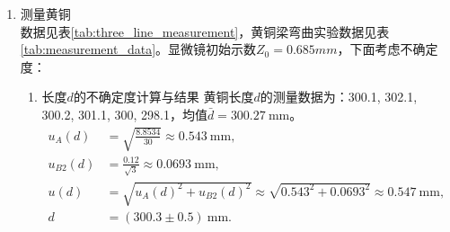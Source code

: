 \documentclass[11pt]{article}
\begin{document}
\begin{enumerate}
    \noindent（2）相对不确定度：  
    \begin{align*}
    u_r(Y) &= \sqrt{\left(3 \cdot \frac{u(d)}{d}\right)^2 + \left(3 \cdot \frac{u(a)}{a}\right)^2 + \left(\frac{u(b)}{b}\right)^2 + \left(\frac{u(\Delta M)}{\Delta M}\right)^2 + \left(\frac{u(\Delta Z)}{\Delta Z}\right)^2} \\
    &= \sqrt{\left(3 \cdot \frac{0.3}{229.9}\right)^2 + \left(3 \cdot \frac{0.004}{0.964}\right)^2 + \left(\frac{0.06}{23.09}\right)^2 + \left(\frac{0.1}{80.0}\right)^2 + \left(\frac{0.03}{0.56}\right)^2} \\
    &\approx \sqrt{0.0000154 + 0.000155 + 0.00000675 + 0.00000156 + 0.002869} \\
    &\approx \sqrt{0.003092} \approx 0.0556
    \end{align*}
    
    \noindent（3）绝对不确定度与最终结果：  
    \begin{align*}
    u(Y) &= \bar{Y} \cdot u_r(Y) \approx 2.10 \times 10^{11} \times 0.0556 \approx 1.2 \times 10^{10} \, \text{Pa} \\
    \bar{Y} &= (2.1 \pm 0.1) \times 10^{11} \, \text{Pa}
    \end{align*}
    
    \noindent 计算相对误差\(\eta\)：  
    
    \noindent 相对误差公式为\(\eta = \left| \frac{Y - Y_0}{Y_0} \right| \times 100\%\)，其中：  
    
    \noindent 实验值\(Y = 2.1 \times 10^{11} \, \text{Pa}\)，标准值\(Y_0 = 18.15 \times 10^{10} \, \text{Pa} = 1.815 \times 10^{11} \, \text{Pa}\)。  
    
    \noindent 代入公式计算：  
    \begin{align*}
    \eta &= \left| \frac{2.1 \times 10^{11} - 1.815 \times 10^{11}}{1.815 \times 10^{11}} \right| \times 100\% \\
    &= \left| \frac{0.285 \times 10^{11}}{1.815 \times 10^{11}} \right| \times 100\% \\
    &\approx 0.157 \times 100\% \\
    &\approx 15.7\%
    \end{align*}

    \item 测量黄铜\\
    数据见表\ref{tab:three_line_measurement}，黄铜梁弯曲实验数据见表\ref{tab:measurement_data}。显微镜初始示数$Z_0 = 0.685mm$，下面考虑不确定度：
\begin{enumerate}
  \item 长度\( d \)的不确定度计算与结果
  黄铜长度\( d \)的测量数据为：300.1, 302.1, 300.2, 301.1, 300, 298.1，均值\( \bar{d} = 300.27\ \text{mm} \)。
  \begin{align*}
    u_A(d) &= \sqrt{\frac{8.8534}{30}} \approx 0.543\ \text{mm}, \\
    u_{B2}(d) &= \frac{0.12}{\sqrt{3}} \approx 0.0693\ \text{mm}, \\
    u(d) &= \sqrt{u_A(d)^2 + u_{B2}(d)^2} \approx \sqrt{0.543^2 + 0.0693^2} \approx 0.547\ \text{mm}, \\
    d &= (300.3 \pm 0.5)\ \text{mm}.
  \end{align*}


\end{enumerate}
\end{enumerate}
\end{document}
